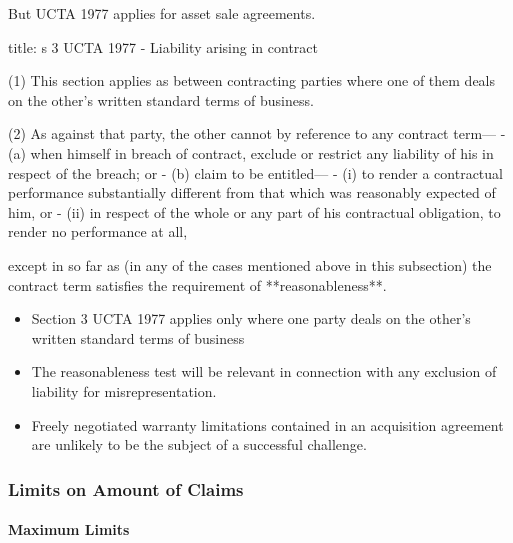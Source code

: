 \documentclass[
]{article}
\newenvironment{Shaded}{}{}
\newcommand{\NormalTok}[1]{#1}
\providecommand{\tightlist}{%
  \setlength{\itemsep}{0pt}\setlength{\parskip}{0pt}}
\begin{document}
But UCTA 1977 applies for asset sale agreements.

\begin{Shaded}
\begin{Highlighting}[]
\NormalTok{title: s 3 UCTA 1977 {-} Liability arising in contract}

\NormalTok{(1) This section applies as between contracting parties where one of them deals on the other’s written standard terms of business.}

\NormalTok{(2) As against that party, the other cannot by reference to any contract term—}
\NormalTok{{-} (a) when himself in breach of contract, exclude or restrict any liability of his in respect of the breach; or}
\NormalTok{{-} (b) claim to be entitled—}
\NormalTok{    {-} (i) to render a contractual performance substantially different from that which was reasonably expected of him, or}
\NormalTok{    {-} (ii) in respect of the whole or any part of his contractual obligation, to render no performance at all,}

\NormalTok{except in so far as (in any of the cases mentioned above in this subsection) the contract term satisfies the requirement of **reasonableness**. }
\end{Highlighting}
\end{Shaded}

\begin{itemize}
\tightlist
\item
  Section 3 UCTA 1977 applies only where one party deals on the other's
  written standard terms of business
\item
  The reasonableness test will be relevant in connection with any
  exclusion of liability for misrepresentation.
\item
  Freely negotiated warranty limitations contained in an acquisition
  agreement are unlikely to be the subject of a successful challenge.
\end{itemize}

\hypertarget{limits-on-amount-of-claims}{%
\subsubsection{Limits on Amount of
Claims}\label{limits-on-amount-of-claims}}

\hypertarget{maximum-limits}{%
\paragraph{Maximum Limits}\label{maximum-limits}}
\end{document}
